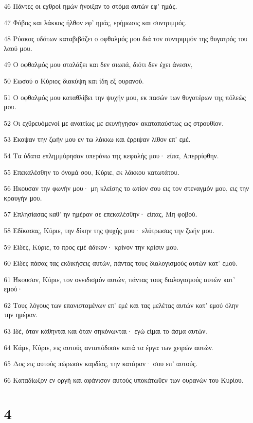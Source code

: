 \par 46 Πάντες οι εχθροί ημών ήνοιξαν το στόμα αυτών εφ' ημάς.
\par 47 Φόβος και λάκκος ήλθον εφ' ημάς, ερήμωσις και συντριμμός.
\par 48 Ρύακας υδάτων καταβιβάζει ο οφθαλμός μου διά τον συντριμμόν της θυγατρός του λαού μου.
\par 49 Ο οφθαλμός μου σταλάζει και δεν σιωπά, διότι δεν έχει άνεσιν,
\par 50 Εωσού ο Κύριος διακύψη και ίδη εξ ουρανού.
\par 51 Ο οφθαλμός μου καταθλίβει την ψυχήν μου, εκ πασών των θυγατέρων της πόλεώς μου.
\par 52 Οι εχθρευόμενοί με αναιτίως με εκυνήγησαν ακαταπαύστως ως στρουθίον.
\par 53 Έκοψαν την ζωήν μου εν τω λάκκω και έρριψαν λίθον επ' εμέ.
\par 54 Τα ύδατα επλημμύρησαν υπεράνω της κεφαλής μου· είπα, Απερρίφθην.
\par 55 Επεκαλέσθην το όνομά σου, Κύριε, εκ λάκκου κατωτάτου.
\par 56 Ήκουσαν την φωνήν μου· μη κλείσης το ωτίον σου εις τον στεναγμόν μου, εις την κραυγήν μου.
\par 57 Επλησίασας καθ' ην ημέραν σε επεκαλέσθην· είπας, Μη φοβού.
\par 58 Εδίκασας, Κύριε, την δίκην της ψυχής μου· ελύτρωσας την ζωήν μου.
\par 59 Είδες, Κύριε, το προς εμέ άδικον· κρίνον την κρίσιν μου.
\par 60 Είδες πάσας τας εκδικήσεις αυτών, πάντας τους διαλογισμούς αυτών κατ' εμού.
\par 61 Ήκουσαν, Κύριε, τον ονειδισμόν αυτών, πάντας τους διαλογισμούς αυτών κατ' εμού·
\par 62 Τους λόγους των επανισταμένων επ' εμέ και τας μελέτας αυτών κατ' εμού όλην την ημέραν.
\par 63 Ιδέ, όταν κάθηνται και όταν σηκόνωνται· εγώ είμαι το άσμα αυτών.
\par 64 Κάμε, Κύριε, εις αυτούς ανταπόδοσιν κατά τα έργα των χειρών αυτών.
\par 65 Δος εις αυτούς πώρωσιν καρδίας, την κατάραν· σου επ' αυτούς.
\par 66 Καταδίωξον εν οργή και αφάνισον αυτούς υποκάτωθεν των ουρανών του Κυρίου.

\chapter{4}

